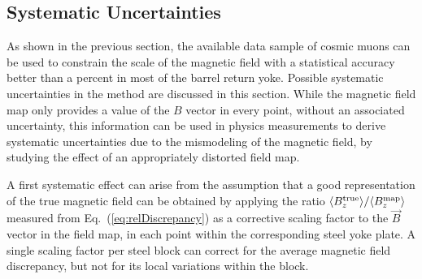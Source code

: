 

\subsection{Systematic Uncertainties}
\label{sec:systematics}

As shown in the previous section, the available data sample of cosmic
muons can be used to constrain the scale of the magnetic field with a
statistical accuracy better than a percent in most of the barrel return yoke.
Possible systematic uncertainties in the method are
discussed in this section.
While the magnetic field map only provides a value of the $B$ vector in
every point, without an associated uncertainty, this information can be
used in physics measurements to derive systematic uncertainties due to
the
mismodeling of the magnetic field, by studying the effect of an
appropriately distorted field map.


A first systematic effect can arise from the assumption that
a good representation of the true magnetic field can be
obtained by applying the ratio
$\langle{B_z^{\rm true}}\rangle/\langle{B_z^{\rm map}}\rangle$ measured from
Eq.~(\ref{eq:relDiscrepancy}) as a
corrective scaling factor to the $\vec{B}$ vector in the
field map, in each point within the corresponding steel yoke plate.
A single scaling factor per steel block can correct for the average magnetic
field discrepancy, but not for its local variations within the block.

